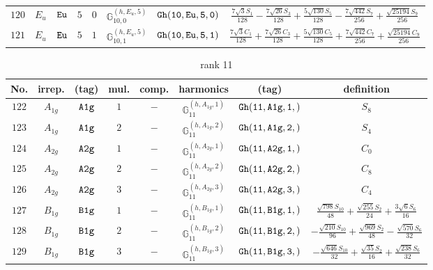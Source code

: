 \documentclass[fleqn,8pt]{jsarticle}
\begin{document}
\begin{table}[ht!]
\begin{center}
\begin{tabular}{cccccccc}
$ 120 $ & $ E_{u} $ & $ {\tt Eu} $ & $ 5 $ & $ 0 $ & $ \mathbb{G}_{10,0}^{(h,E_{u},5)} $ & $ {\tt Gh(10,Eu,5,0)} $ & $ \frac{7 \sqrt{3} S_{1}}{128} - \frac{7 \sqrt{26} S_{3}}{128} + \frac{5 \sqrt{130} S_{5}}{128} - \frac{7 \sqrt{442} S_{7}}{256} + \frac{\sqrt{25194} S_{9}}{256} $ \\
$ 121 $ & $ E_{u} $ & $ {\tt Eu} $ & $ 5 $ & $ 1 $ & $ \mathbb{G}_{10,1}^{(h,E_{u},5)} $ & $ {\tt Gh(10,Eu,5,1)} $ & $ \frac{7 \sqrt{3} C_{1}}{128} + \frac{7 \sqrt{26} C_{3}}{128} + \frac{5 \sqrt{130} C_{5}}{128} + \frac{7 \sqrt{442} C_{7}}{256} + \frac{\sqrt{25194} C_{9}}{256} $ \\
 \hline \hline
\end{tabular}
\end{center}
\end{table}
\begin{table}[ht!]
\begin{center}
\caption{rank 11}
\renewcommand{\arraystretch}{1.3}
\begin{tabular}{cccccccc} \hline \hline
No. & irrep. & (tag) & mul. & comp. & harmonics & (tag) & definition \\ \hline
$ 122 $ & $ A_{1g} $ & $ {\tt A1g} $ & $ 1 $ & $ - $ & $ \mathbb{G}_{11}^{(h,A_{1g},1)} $ & $ {\tt Gh(11,A1g,1,)} $ & $ S_{8} $ \\
$ 123 $ & $ A_{1g} $ & $ {\tt A1g} $ & $ 2 $ & $ - $ & $ \mathbb{G}_{11}^{(h,A_{1g},2)} $ & $ {\tt Gh(11,A1g,2,)} $ & $ S_{4} $ \\
$ 124 $ & $ A_{2g} $ & $ {\tt A2g} $ & $ 1 $ & $ - $ & $ \mathbb{G}_{11}^{(h,A_{2g},1)} $ & $ {\tt Gh(11,A2g,1,)} $ & $ C_{0} $ \\
$ 125 $ & $ A_{2g} $ & $ {\tt A2g} $ & $ 2 $ & $ - $ & $ \mathbb{G}_{11}^{(h,A_{2g},2)} $ & $ {\tt Gh(11,A2g,2,)} $ & $ C_{8} $ \\
$ 126 $ & $ A_{2g} $ & $ {\tt A2g} $ & $ 3 $ & $ - $ & $ \mathbb{G}_{11}^{(h,A_{2g},3)} $ & $ {\tt Gh(11,A2g,3,)} $ & $ C_{4} $ \\
$ 127 $ & $ B_{1g} $ & $ {\tt B1g} $ & $ 1 $ & $ - $ & $ \mathbb{G}_{11}^{(h,B_{1g},1)} $ & $ {\tt Gh(11,B1g,1,)} $ & $ \frac{\sqrt{798} S_{10}}{48} + \frac{\sqrt{255} S_{2}}{24} + \frac{3 \sqrt{6} S_{6}}{16} $ \\
$ 128 $ & $ B_{1g} $ & $ {\tt B1g} $ & $ 2 $ & $ - $ & $ \mathbb{G}_{11}^{(h,B_{1g},2)} $ & $ {\tt Gh(11,B1g,2,)} $ & $ - \frac{\sqrt{210} S_{10}}{96} + \frac{\sqrt{969} S_{2}}{48} - \frac{\sqrt{570} S_{6}}{32} $ \\
$ 129 $ & $ B_{1g} $ & $ {\tt B1g} $ & $ 3 $ & $ - $ & $ \mathbb{G}_{11}^{(h,B_{1g},3)} $ & $ {\tt Gh(11,B1g,3,)} $ & $ - \frac{\sqrt{646} S_{10}}{32} + \frac{\sqrt{35} S_{2}}{16} + \frac{\sqrt{238} S_{6}}{32} $ \\

\end{tabular}
\end{center}
\end{table}
\end{document}
